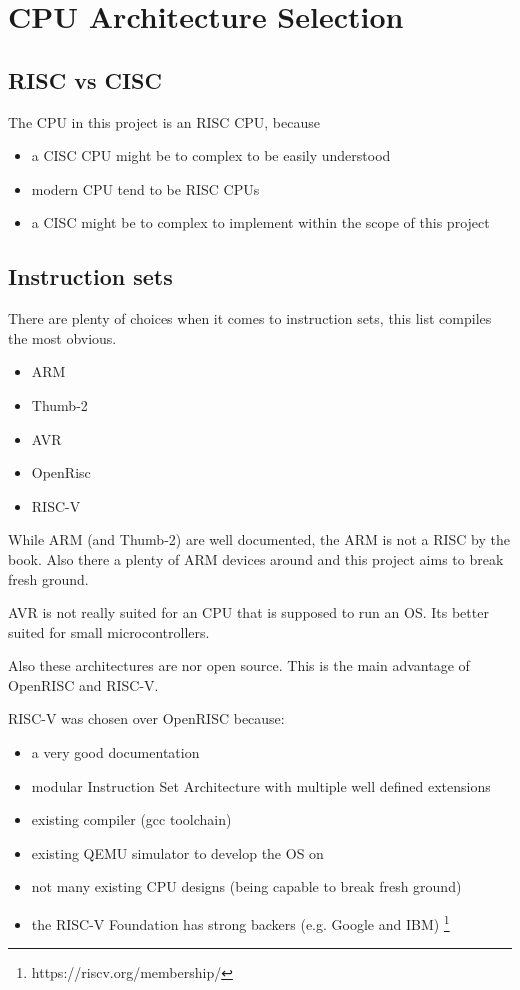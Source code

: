 
\chapter{CPU Architecture Selection}

\section{RISC vs CISC}

The CPU in this project is an RISC CPU, because
\begin{itemize}
	\item a CISC CPU might be to complex to be easily understood
	\item modern CPU tend to be RISC CPUs
	\item a CISC might be to complex to implement within the scope of this project 
\end{itemize}

\section{Instruction sets}
There are plenty of choices when it comes to instruction sets, 
this list compiles the most obvious.

\begin{itemize}
	\item  ARM
	\item Thumb-2
	\item AVR
	\item OpenRisc
	\item RISC-V
\end{itemize}

While ARM (and Thumb-2) are well documented, the ARM is not a RISC by the book.
Also there a plenty of ARM devices around and this project aims to break fresh ground.

AVR is not really suited for an CPU that is supposed to run an OS. 
Its better suited for small microcontrollers.

Also these architectures are nor open source.
This is the main advantage of OpenRISC and RISC-V.

RISC-V was chosen over OpenRISC because:

\begin{itemize}
	\item a very good documentation
	\item modular Instruction Set Architecture with multiple well defined extensions
	\item existing compiler (gcc toolchain)
	\item existing QEMU simulator to develop the OS on
	\item not many existing CPU designs (being capable to break fresh ground)
	\item the RISC-V Foundation has strong backers (e.g. Google and IBM) \footnote{https://riscv.org/membership/}
\end{itemize}

 
